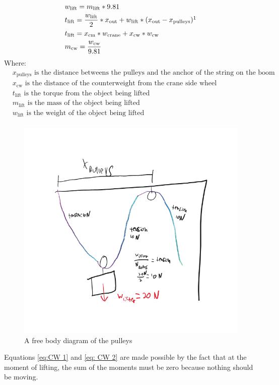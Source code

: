 \documentclass[letterpaper, 12pt]{article}
\begin{document}
\begin{align}
& w_{\text{lift}}=m_{\text{lift}}*9.81 \label{eq:1}\\
& t_{\text{lift}}= \frac{w_\text{lift}}{2}*x_{\text{out}}+ w_{\text{lift}}*(x_\text{out}-x_{\text{pulleys}}) \footnotemark \label{eq:CW 1} \\ 
& t_{\text{lift}} = x_{\text{cm}} * w_{\text{crane}} + x_{\text{cw}} * w_{\text{cw}} \label{eq: CW 2} \\
& m_{\text{cw}} = \frac{w_{\text{cw}}}{9.81} \label{eq:2}
\end{align}
Where:
\begin{equation}
 \begin{split}
    & x_{\text{pulleys}}  \text{ is the distance betweens the pulleys and the anchor of the string on the boom } \\
    & x_{\text{cw}}  \text{ is the distance of the counterweight from the crane side wheel} \\
    & t_{\text{lift}} \text{ is the torque from the object being lifted} \\
    & m_{\text{lift}} \text{ is the mass of the object being lifted} \\
    & w_{\text{lift}} \text{ is the weight of the object being lifted} \\
 \end{split}
\end{equation}

\begin{figure}[H]
    \centering
    \includegraphics[width =0.6\linewidth]{null (2).png}
    \caption{A free body diagram of the pulleys}
    \label{fig:Pulleys}
\end{figure}
Equations \ref{eq:CW 1} and \ref{eq: CW 2} are made possible by the fact that at the moment of lifting, the sum of the moments must be zero because nothing should be moving.
\end{document}
